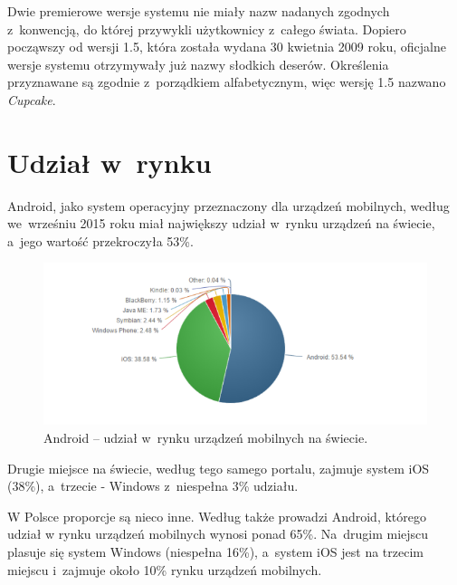 Dwie premierowe wersje systemu nie miały nazw nadanych zgodnych z~konwencją, do której przywykli użytkownicy z~całego świata. Dopiero począwszy od wersji 1.5, która została wydana 30 kwietnia 2009 roku, oficjalne wersje systemu otrzymywały już nazwy słodkich deserów. Określenia przyznawane są zgodnie z~porządkiem alfabetycznym, więc wersję 1.5 nazwano \textit{Cupcake}.

\section{Udział w~rynku}
Android, jako system operacyjny przeznaczony dla urządzeń mobilnych, według \cite{website:android:stat2} we~wrześniu 2015 roku miał największy udział w~rynku urządzeń na świecie, a~jego wartość przekroczyła 53\%.

\begin{figure}[!htb]
    \centering
    \includegraphics[width=17cm]{imgs/ch2_android_udzial_2.png}
    \caption
{Android – udział w~rynku urządzeń mobilnych na świecie\cite{website:android:stat2}.}
    \label{fig:android_udzial_zagranica}
\end{figure} 

Drugie miejsce na świecie, według tego samego portalu, zajmuje system iOS (38\%), a~trzecie - Windows z~niespełna 3\% udziału. 

W Polsce proporcje są nieco inne. Według \cite{website:android:stat1} także prowadzi Android, którego udział w rynku urządzeń mobilnych wynosi ponad 65\%. Na~drugim miejscu plasuje się system Windows (niespełna 16\%), a~system iOS jest na trzecim miejscu i~zajmuje około 10\% rynku urządzeń mobilnych.

